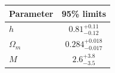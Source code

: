 \begin{tabular} { l  c}

 Parameter &  95\% limits\\
\hline
{\boldmath$h              $} & $0.81^{+0.11}_{-0.12}      $\\

{\boldmath$Ω_m            $} & $0.284^{+0.018}_{-0.017}   $\\

{\boldmath$M              $} & $2.6^{+3.8}_{-3.5}         $\\
\hline
\end{tabular}